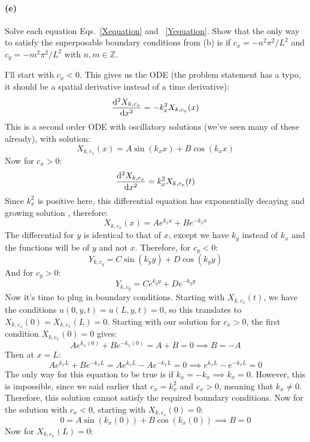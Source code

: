 \documentclass{article}
\begin{document}
\paragraph{(e)}
Solve each equation Eqs.~\ref{Xequation} and ~\ref{Yequation}.
Show that the only way to satisfy the superposable boundary conditions from (b) is if $c_{x} = -n^{2}\pi^{2}/L^{2}$ and $c_{y} = -m^{2}\pi^{2}/L^{2}$
with $n,m\in\mathbb{Z}$.\\

\begin{solution}
	I'll start with $c_x < 0$. This gives us the ODE (the problem statement has a typo, it should be 
	a spatial derivative instead of a time derivative):
	\[
		\dv[2]{X_{k, c_x}}{x} = -k_x^2 X_{k, c_x}(x)
	\] 
	This is a second order ODE with oscillatory solutions (we've seen many of these already), with 
	solution: 
	\[
		X_{k, c_x}(x) = A\sin(k_x x) + B \cos(k_x x)
	\] 
	Now for $c_x >0$:
	\[
		\dv[2]{X_{k, c_x}}{x} = k_x^2 X_{k, c_x}(t)
	\] 
	Since $k_x^2$ is positive here, this differential equation has exponentially decaying and growing 
	solution , therefore:
	\[
		X_{k, c_x}(x) = Ae^{k_x x} + Be^{-k_x x}
	\] 
	The differential for $y$ is identical to that of $x$, except we have $k_y$ instead of $k_x$ and 
	the functions will be of $y$ and not $x$. Therefore, for $c_y < 0$:
	\[
		Y_{k, c_y} = C \sin(k_y y) + D \cos(k_y y)
	\] 
	And for $c_y > 0$:
	\[
		Y_{k, c_y} = Ce^{k_y y} + De^{-k_y y}
	\] 
	Now it's time to plug in boundary conditions. Starting with $X_{k, c_x}(t)$, we have the conditions $u(0, y, t) = 
	u(L, y, t) = 0$, so this translates to $X_{k, c_x}(0) = X_{k, c_x}(L) = 0$. Starting with our solution for 
	$c_x > 0$, the first condition $X_{k, c_x}(0) = 0$ gives: 
	\[
		Ae^{k_x(0)} + Be^{-k_x(0)} = A + B = 0 \implies B = -A
	\] 
	Then at $x = L$:
	\[
		Ae^{k_x L} + Be^{-k_x L} = Ae^{k_x L} - Ae^{-k_x L} = 0 \implies e^{k_x L} - e^{-k_x L} = 0
	\] 
	The only way for this equation to be true is if $k_x = -k_x \implies k_x = 0$. However, this is impossible, 
	since we said earlier that $c_x = k_x^2$ and $c_x > 0$, meaning that $k_x \neq 0$. Therefore, this 
	solution cannot satisfy the required boundary conditions. Now for the solution with $c_x < 0$, starting
	with $X_{k, c_x}(0) = 0$:
	\[
	0 = A \sin(k_x (0)) + B \cos(k_x (0)) \implies B = 0
	\] 
	Now for $X_{k, c_x}(L) = 0$:

\end{solution}
\end{document}
